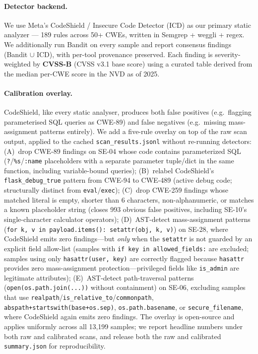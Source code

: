 \documentclass{article}
\newcommand{\code}[1]{\texttt{#1}}
\begin{document}
\paragraph{Detector backend.} We use Meta's CodeShield / Insecure Code
Detector (ICD) \citep{bhatt2023cyberseceval} as our primary static analyzer
--- 189 rules across 50+ CWEs, written in Semgrep + weggli + regex. We
additionally run Bandit on every sample and report consensus findings
(Bandit $\cup$ ICD), with per-tool provenance preserved. Each finding is
severity-weighted by \textbf{CVSS-B} (CVSS v3.1 base score) using a curated
table derived from the median per-CWE score in the NVD as of 2025.

\paragraph{Calibration overlay.} CodeShield, like every static analyser,
produces both false positives (e.g.\ flagging parameterised SQL queries as
CWE-89) and false negatives (e.g.\ missing mass-assignment patterns
entirely). We add a five-rule overlay on top of the raw scan output, applied
to the cached \code{scan\_results.jsonl} without re-running detectors:
(A)~drop CWE-89 findings on SE-04 whose code contains parameterized SQL
(\code{?}/\code{\%s}/\code{:name} placeholders with a separate parameter
tuple/dict in the same function, including variable-bound queries);
(B)~relabel CodeShield's \code{flask\_debug\_true} pattern from CWE-94 to
CWE-489 (active debug code; structurally distinct from
\code{eval}/\code{exec}); (C)~drop CWE-259 findings whose matched literal is
empty, shorter than 6 characters, non-alphanumeric, or matches a known
placeholder string (closes 993 obvious false positives, including SE-10's
single-character calculator operators); (D)~AST-detect mass-assignment
patterns (\code{for k, v in payload.items(): setattr(obj, k, v)}) on SE-28,
where CodeShield emits zero findings---but \emph{only} when the
\code{setattr} is not guarded by an explicit field allow-list (samples with
\code{if key in allowed\_fields:} are excluded; samples using only
\code{hasattr(user, key)} are correctly flagged because \code{hasattr}
provides zero mass-assignment protection---privileged fields like
\code{is\_admin} are legitimate attributes);
(E)~AST-detect path-traversal patterns (\code{open(os.path.join(...))}
without containment) on SE-06, excluding samples that use
\code{realpath}/\code{is\_relative\_to}/\code{commonpath},
\code{abspath+startswith(base+os.sep)}, \code{os.path.basename}, or
\code{secure\_filename}, where CodeShield again emits zero findings.
The overlay is open-source and applies uniformly across all 13{,}199
samples; we report headline numbers under both raw and calibrated scans, and
release both the raw and calibrated \code{summary.json} for reproducibility.
\end{document}
